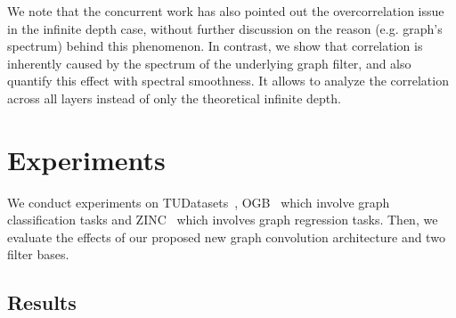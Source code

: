 \documentclass[nohyperref]{article}
\theoremstyle{plain}
\theoremstyle{definition}
\theoremstyle{remark}
\begin{document}
We note that the concurrent work \cite{jin2022towards} has also pointed out the overcorrelation issue in the infinite depth case, without further discussion on the reason (e.g. graph's spectrum) behind this phenomenon.
In contrast, we show that correlation is inherently caused by the  spectrum of the underlying graph filter, and also quantify this effect with spectral smoothness.
It allows to analyze the correlation across all layers instead of only the theoretical infinite depth.


\section{Experiments}

We conduct experiments on TUDatasets~\cite{yanardag2015deep,KKMMN2016}, OGB~\cite{hu2020open} which involve graph classification tasks and ZINC~\cite{dwivedi2020benchmarking} which involves graph regression tasks.
Then, we evaluate the effects of our proposed new graph convolution architecture and two filter bases.

\subsection{Results}
\end{document}
